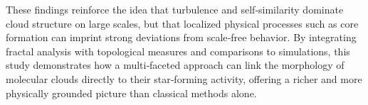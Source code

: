 These findings reinforce the idea that turbulence and self‑similarity dominate cloud structure on large scales, but that localized physical processes such as core formation can imprint strong deviations from scale‑free behavior.  
By integrating fractal analysis with topological measures and comparisons to simulations, this study demonstrates how a multi‑faceted approach can link the morphology of molecular clouds directly to their star‑forming activity, offering a richer and more physically grounded picture than classical methods alone.